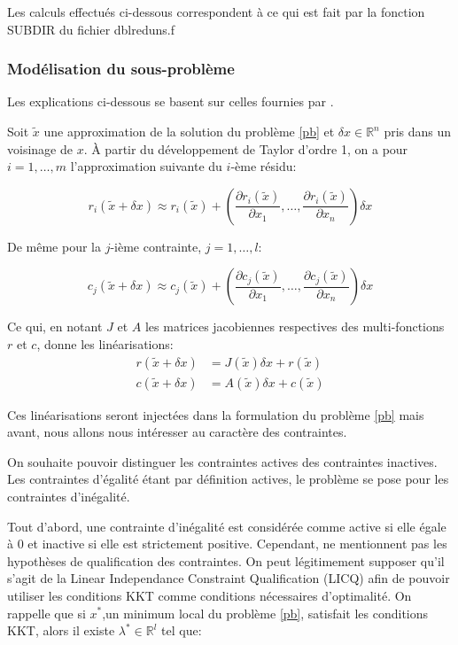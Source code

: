 \documentclass[a4paper,11pt]{article}
\newcommand{\real}{\mathbb{R}}
\numberwithin{equation}{section}
\begin{document}
Les calculs effectués ci-dessous correspondent à ce qui est fait par la fonction SUBDIR du fichier dblreduns.f
\subsubsection{Modélisation du sous-problème} \label{gn:model}

Les explications ci-dessous se basent sur celles fournies par \cite{lindstromwedin1988}.

Soit $\tilde{x}$ une approximation de la solution du problème \ref{pb} et $\delta x \in \real^{n}$ pris dans un voisinage de $x$. \`A partir du développement de Taylor d'ordre 1, on a pour $i=1,\ldots,m$ l'approximation suivante du $i$-ème résidu:

\begin{equation}
r_{i}(\tilde{x} + \delta x) \approx r_{i}(\tilde{x}) + \left(\dfrac{\partial r_{i}(\tilde{x})}{\partial x_{1}}, \ldots, \dfrac{\partial r_{i}(\tilde{x})}{\partial x_{n}}\right)\delta x
\end{equation}

De même pour la $j$-ième contrainte, $j=1,\ldots,l$: 

\begin{equation}
c_{j}(\tilde{x} + \delta x) \approx c_{j}(\tilde{x}) + \left(\dfrac{\partial c_{j}(\tilde{x})}{\partial x_{1}}, \ldots, \dfrac{\partial c_{j}(\tilde{x})}{\partial x_{n}}\right)\delta x
\end{equation}


Ce qui, en notant $J$ et $A$ les matrices jacobiennes respectives des multi-fonctions $r$ et $c$, donne les linéarisations:
\begin{align} 
r(\tilde{x}+\delta x) &= J(\tilde{x})\delta x + r(\tilde{x}) \label{linearisationr}\\
c(\tilde{x}+\delta x) &= A(\tilde{x})\delta x + c(\tilde{x}) \label{linearisationc}
\end{align}

Ces linéarisations seront injectées dans la formulation du problème \eqref{pb} mais avant, nous allons nous intéresser au caractère des contraintes.

On souhaite pouvoir distinguer les contraintes actives des contraintes inactives. Les contraintes d'égalité étant par définition actives, le problème se pose pour les contraintes d'inégalité. 

Tout d'abord, une contrainte d'inégalité est considérée comme active si elle égale à $0$ et inactive si elle est strictement positive.  Cependant, \cite{lindstromwedin1988} ne mentionnent pas les hypothèses de qualification des contraintes. On peut légitimement supposer qu'il s'agit de la Linear Independance Constraint Qualification (LICQ) afin de pouvoir utiliser les conditions KKT comme conditions nécessaires d'optimalité. On rappelle que si $x^{*}$,un minimum local du problème \eqref{pb}, satisfait les conditions KKT, alors il existe $\lambda^{*} \in \real^{l}$ tel que:
\end{document}
